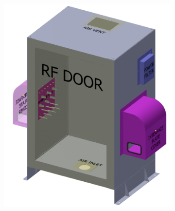 \begin{figure}[t]
    \centering
    \centering
    \begin{subfigure}{.45\textwidth}
        \centering
        \includegraphics[width=\linewidth]{backend_diag}
    \end{subfigure}
    \hfill
    \begin{subfigure}{.4\textwidth}
    \centering

\end{subfigure}
\end{figure}
